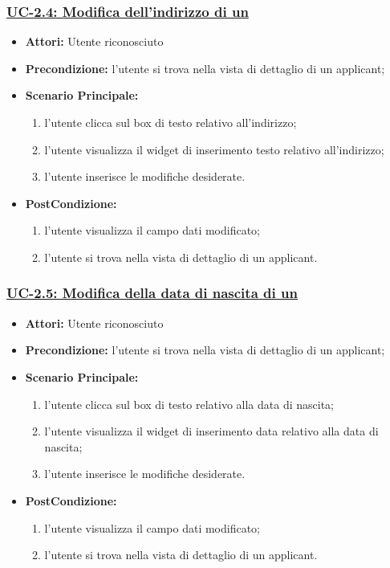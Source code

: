 \subsubsection{\underline{UC-2.4: Modifica dell'indirizzo di un \applicant}}
\begin{itemize}
	\item \textbf{Attori:} Utente riconosciuto
	\item \textbf{Precondizione:}  l'utente si trova nella vista di dettaglio di un applicant;
	\item \textbf{Scenario Principale:}
	\begin{enumerate}
		\item l'utente clicca sul box di testo relativo all'indirizzo;
		\item l'utente visualizza il  widget di inserimento testo relativo all'indirizzo;
		\item l'utente inserisce le modifiche desiderate.
	\end{enumerate}
	\item \textbf{PostCondizione:} 
	\begin{enumerate}
		\item l'utente visualizza il campo dati modificato;
		\item l'utente si trova nella vista di dettaglio di un applicant.
	\end{enumerate}
	
\end{itemize}

\subsubsection{\underline{UC-2.5: Modifica della data di nascita di un \applicant}}
\begin{itemize}
	\item \textbf{Attori:} Utente riconosciuto
	\item \textbf{Precondizione:}  l'utente si trova nella vista di dettaglio di un applicant;
	\item \textbf{Scenario Principale:}
	\begin{enumerate}
		\item l'utente clicca sul box di testo relativo alla data di nascita;
		\item l'utente visualizza il  widget di inserimento data relativo alla data di nascita;
		\item l'utente inserisce le modifiche desiderate.
	\end{enumerate}
	\item \textbf{PostCondizione:} 
	\begin{enumerate}
		\item l'utente visualizza il campo dati modificato;
		\item l'utente si trova nella vista di dettaglio di un applicant.
	\end{enumerate}
	
\end{itemize}


